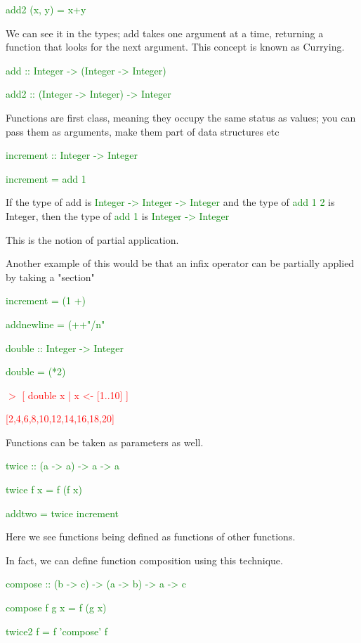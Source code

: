 \documentclass{article}
\begin{document}
\textcolor{green}{add2  (x, y) = x+y}

We can see it in the types; add takes one argument at a time, returning a function that looks for the next argument. This concept is known as Currying.

\textcolor{green}{add  ::  Integer -> (Integer -> Integer)}

\textcolor{green}{add2  ::  (Integer -> Integer) -> Integer}


Functions are first class, meaning they occupy the same status as values; you can pass them as arguments, make them part of data structures etc

\textcolor{green}{increment  ::  Integer -> Integer}

\textcolor{green}{increment  = add 1}

If the type of add is \textcolor{green}{Integer -> Integer -> Integer} and the type of \textcolor{green}{add 1 2} is Integer, then the type of \textcolor{green}{add 1} is \textcolor{green}{Integer -> Integer}

This is the notion of partial application.

Another example of this would be that an infix operator can be partially applied by taking a "section"

\textcolor{green}{increment = (1 +)}

\textcolor{green}{addnewline = (++"/n"}

\textcolor{green}{double  :: Integer -> Integer}

\textcolor{green}{double = (*2)}

\textcolor{red}{$>$ [  double  x | x <- [1..10]  ]}

\textcolor{red}{[2,4,6,8,10,12,14,16,18,20]}

Functions can be taken as parameters as well.

\textcolor{green}{twice  ::  (a -> a) -> a -> a}

\textcolor{green}{twice  f  x = f  (f  x)}

\textcolor{green}{addtwo = twice increment}

Here we see functions being defined as functions of other functions.

In fact, we can define function composition using this technique.

\textcolor{green}{compose  ::  (b -> c) -> (a -> b) -> a -> c}

\textcolor{green}{compose  f  g  x = f  (g  x)}

\textcolor{green}{twice2  f = f  'compose'  f}
\end{document}
